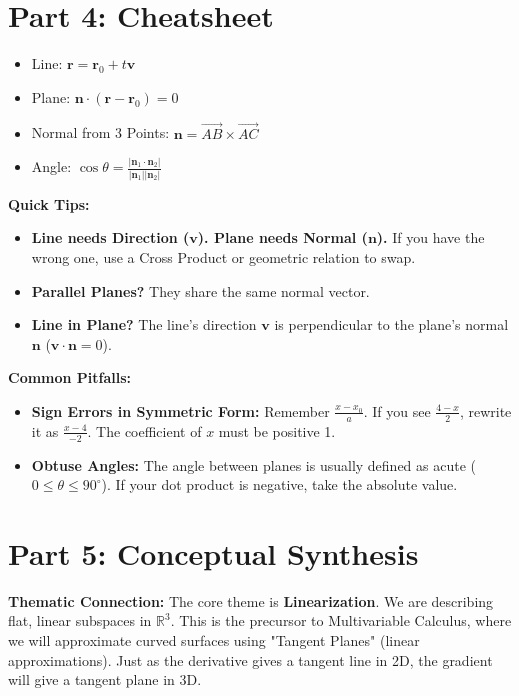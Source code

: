 \documentclass[11pt]{article}
\begin{document}
\section{Part 4: Cheatsheet}

\begin{tcolorbox}[title=Essential Formulas]
\begin{itemize}
    \item Line: $\mathbf{r} = \mathbf{r}_0 + t\mathbf{v}$
    \item Plane: $\mathbf{n} \cdot (\mathbf{r} - \mathbf{r}_0) = 0$
    \item Normal from 3 Points: $\mathbf{n} = \vec{AB} \times \vec{AC}$
    \item Angle: $\cos \theta = \frac{|\mathbf{n}_1 \cdot \mathbf{n}_2|}{|\mathbf{n}_1||\mathbf{n}_2|}$
\end{itemize}
\end{tcolorbox}

\textbf{Quick Tips:}
\begin{itemize}
    \item \textbf{Line needs Direction ($\mathbf{v}$). Plane needs Normal ($\mathbf{n}$).} If you have the wrong one, use a Cross Product or geometric relation to swap.
    \item \textbf{Parallel Planes?} They share the same normal vector.
    \item \textbf{Line in Plane?} The line's direction $\mathbf{v}$ is perpendicular to the plane's normal $\mathbf{n}$ ($\mathbf{v} \cdot \mathbf{n} = 0$).
\end{itemize}

\textbf{Common Pitfalls:}
\begin{itemize}
    \item \textbf{Sign Errors in Symmetric Form:} Remember $\frac{x-x_0}{a}$. If you see $\frac{4-x}{2}$, rewrite it as $\frac{x-4}{-2}$. The coefficient of $x$ must be positive 1.
    \item \textbf{Obtuse Angles:} The angle between planes is usually defined as acute ($0 \le \theta \le 90^\circ$). If your dot product is negative, take the absolute value.
\end{itemize}

\newpage

\section{Part 5: Conceptual Synthesis}
\textbf{Thematic Connection:} The core theme is \textbf{Linearization}. We are describing flat, linear subspaces in $\mathbb{R}^3$. This is the precursor to Multivariable Calculus, where we will approximate curved surfaces using "Tangent Planes" (linear approximations). Just as the derivative gives a tangent line in 2D, the gradient will give a tangent plane in 3D.
\end{document}
